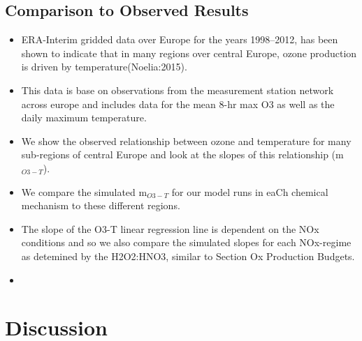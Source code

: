 \documentclass[11pt,a4paper]{article}
\begin{document}
\subsection{Comparison to Observed Results}
\begin{itemize}
    \item ERA-Interim gridded data over Europe for the years 1998--2012, has been shown to indicate that in many regions over central Europe, ozone production is driven by temperature(Noelia:2015).
    \item This data is base on observations from the measurement station network across europe and includes data for the mean 8-hr max O3 as well as the daily maximum temperature.
    \item We show the observed relationship between ozone and temperature for many sub-regions of central Europe and look at the slopes of this relationship (m$_{O3-T}$).
    \item We compare the simulated m$_{O3-T}$ for our model runs in eaCh chemical mechanism to these different regions.
    \item The slope of the O3-T linear regression line is dependent on the NOx conditions and so we also compare the simulated slopes for each NOx-regime as detemined by the H2O2:HNO3, similar to Section Ox Production Budgets.
    \item \color{red}{Missing results}
\end{itemize}

\section{Discussion} \label{s:discussion}
\end{document}
